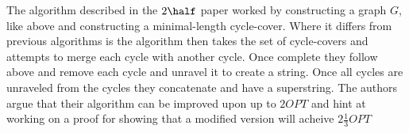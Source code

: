 \documentclass[letterpaper,11pt,titlepage]{article}
\begin{document}
The algorithm described in the $2\half$ paper worked by constructing a graph $G$, like above and constructing a minimal-length cycle-cover. Where it differs from previous algorithms is the algorithm then takes the set of cycle-covers and attempts to merge each cycle with another cycle. Once complete they follow above and remove each cycle and unravel it to create a string. Once all cycles are unraveled from the cycles they concatenate and have a superstring. The authors argue that their algorithm can be improved upon up to $2OPT$ and hint at working on a proof for showing that a modified version will acheive $2\frac{1}{3} OPT$\\

\newpage

{
  \small 
  
  
}
\end{document}
